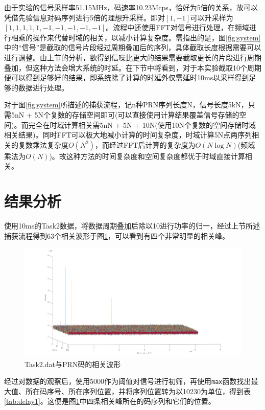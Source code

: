 \documentclass[a4paper, 10pt]{article}
\begin{document}
由于实验的信号采样率51.15MHz，码速率10.23Mcps，恰好为5倍的关系，故可以凭借先验信息对码序列进行5倍的理想升采样。即对$[1, -1]$可以升采样为$[1,1,1,1,1,-1,-1,-1,-1,-1]$。流程中还使用FFT对信号进行处理，在频域进行相乘的操作来代替时域的相关，以减小计算复杂度。需指出的是，图\ref{fig:system}中的“信号”是截取的信号片段经过周期叠加后的序列，具体截取长度根据需要可以进行调整。由上节的分析，欲得到信噪比更大的结果需要截取更长的片段进行周期叠加，但这种方法会增大系统的时延。在下节中将看到，对于本实验截取10个周期便可以得到足够好的结果，即系统除了计算的时延外仅需延时10ms以采样得到足够的数据进行处理。

对于图\ref{fig:system}所描述的捕获流程，记n种PRN序列长度N，信号长度5kN，只需5nN + 5N个复数的存储空间即可(可以直接使用计算结果覆盖信号存储的空间)。而完全在时域计算相关需5nN + 5N + 10N(使用10N个复数的空间存储时域相关结果)。同时FFT可以极大地减小计算的时间复杂度，时域计算5N点两序列相关的复数乘法复杂度$O(N^2)$，而经过FFT后计算的复杂度为$O(N\log N)$(频域乘法为$O(N)$)。故这种方法的时间复杂度和空间复杂度都优于时域直接计算相关。

\section{结果分析}

使用10ms的Task2数据，将数据周期叠加后除以10进行功率的归一，经过上节所述捕获流程得到63个相关波形于图\ref{fig:corr}，可以看到有四个非常明显的相关峰。

\begin{figure}[htb]
    \centering
    \includegraphics[width=.9\textwidth]{../assets/corr.png}
    \caption{Task2.dat与PRN码的相关波形}
    \label{fig:corr}
\end{figure}

经过对数据的观察后，使用5000作为阈值对信号进行初筛，再使用\texttt{max}函数找出最大值、所在码序号、所在序列位置，并将序列位置转为以10230为单位，得到表\ref{tab:delay1}。这便是图\ref{fig:corr}中四条相关峰所在的码序列和它们的位置。
\end{document}

